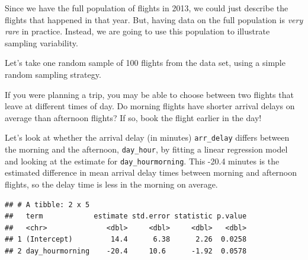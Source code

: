 \documentclass[
]{book}
\newenvironment{Shaded}{\begin{snugshade}}{\end{snugshade}}
\newcommand{\CommentTok}[1]{\textcolor[rgb]{0.56,0.35,0.01}{\textit{#1}}}
\newcommand{\DataTypeTok}[1]{\textcolor[rgb]{0.13,0.29,0.53}{#1}}
\newcommand{\DecValTok}[1]{\textcolor[rgb]{0.00,0.00,0.81}{#1}}
\newcommand{\KeywordTok}[1]{\textcolor[rgb]{0.13,0.29,0.53}{\textbf{#1}}}
\newcommand{\NormalTok}[1]{#1}
\newcommand{\OperatorTok}[1]{\textcolor[rgb]{0.81,0.36,0.00}{\textbf{#1}}}
\newcommand{\StringTok}[1]{\textcolor[rgb]{0.31,0.60,0.02}{#1}}
\begin{document}
Since we have the full population of flights in 2013, we could just describe the flights that happened in that year. But, having data on the full population is \emph{very rare} in practice. Instead, we are going to use this population to illustrate sampling variability.

Let's take one random sample of 100 flights from the data set, using a simple random sampling strategy.

\begin{Shaded}
\end{Shaded}

If you were planning a trip, you may be able to choose between two flights that leave at different times of day. Do morning flights have shorter arrival delays on average than afternoon flights? If so, book the flight earlier in the day!

Let's look at whether the arrival delay (in minutes) \texttt{arr\_delay} differs between the morning and the afternoon, \texttt{day\_hour}, by fitting a linear regression model and looking at the estimate for \texttt{day\_hourmorning}. This -20.4 minutes is the estimated difference in mean arrival delay times between morning and afternoon flights, so the delay time is less in the morning on average.

\begin{Shaded}
\end{Shaded}

\begin{verbatim}
## # A tibble: 2 x 5
##   term            estimate std.error statistic p.value
##   <chr>              <dbl>     <dbl>     <dbl>   <dbl>
## 1 (Intercept)         14.4      6.38      2.26  0.0258
## 2 day_hourmorning    -20.4     10.6      -1.92  0.0578
\end{verbatim}
\end{document}
